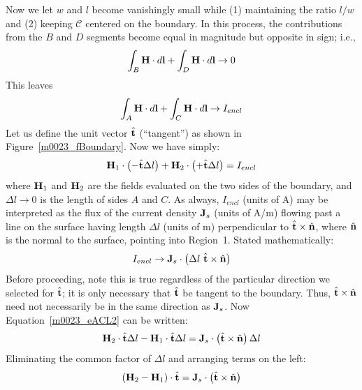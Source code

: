 %  
Now we let $w$ and $l$ become vanishingly small while (1) maintaining the ratio $l/w$ and (2) keeping $\mathcal{C}$ centered on the boundary.
In this process, the contributions from the $B$ and $D$ segments become equal in magnitude but opposite in sign; i.e., 
% 
\begin{equation}   
\int_B{ {\bf H} \cdot d{\bf l} } 
+\int_D{ {\bf H} \cdot d{\bf l} }
\to 0
\end{equation}
%
This leaves
% 
\begin{equation}   
\int_A{ {\bf H} \cdot d{\bf l} } 
+\int_C{ {\bf H} \cdot d{\bf l} }
\to I_{encl}
\end{equation}
%
Let us define the unit vector $\hat{\bf t}$ (``tangent'') as shown in Figure~\ref{m0023_fBoundary}.
Now we have simply: 
% 
\begin{equation}   
  {\bf H}_1 \cdot \left(-\hat{\bf t}\Delta l\right)
+ {\bf H}_2 \cdot \left(+\hat{\bf t}\Delta l\right) 
= I_{encl} 
\label{m0023_eACL2}
\end{equation}
%
where ${\bf H}_1$ and ${\bf H}_2$ are the fields evaluated on the two sides of the boundary, and
$\Delta l \to 0$ is the length of sides $A$ and $C$.
As always, $I_{encl}$ (units of A) may be interpreted as the flux
of the current density ${\bf J}_s$ (units of A/m) flowing past a line on the surface having length $\Delta l$ (units of m) perpendicular to $\hat{\bf t}\times\hat{\bf n}$, where $\hat{\bf n}$ is the normal to the surface, pointing into Region~1.  Stated mathematically:
%
\begin{equation}
I_{encl} \rightarrow {\bf J}_s \cdot \left( \Delta l ~ \hat{\bf t}\times\hat{\bf n} \right)
\end{equation}
% 
Before proceeding, note this is true regardless of the particular direction we selected for $\hat{\bf t}$; it is only necessary that $\hat{\bf t}$ be tangent to the boundary. Thus, $\hat{\bf t}\times\hat{\bf n}$ need not necessarily be in the same direction as ${\bf J}_s$.
%
Now Equation~\ref{m0023_eACL2} can be written:
% 
\begin{equation}   
  {\bf H}_2 \cdot       \hat{\bf t}                        \Delta l
- {\bf H}_1 \cdot       \hat{\bf t}                        \Delta l 
= {\bf J}_s \cdot \left(\hat{\bf t}\times\hat{\bf n}\right)\Delta l
\end{equation}
%
Eliminating the common factor of $\Delta l$ and arranging terms on the left:
% 
\begin{equation}   
 \left( {\bf H}_2 -{\bf H}_1 \right) \cdot \hat{\bf t} = {\bf J}_s \cdot \left(\hat{\bf t}\times\hat{\bf n}\right)
\label{m0023_eACL3}
\end{equation}
